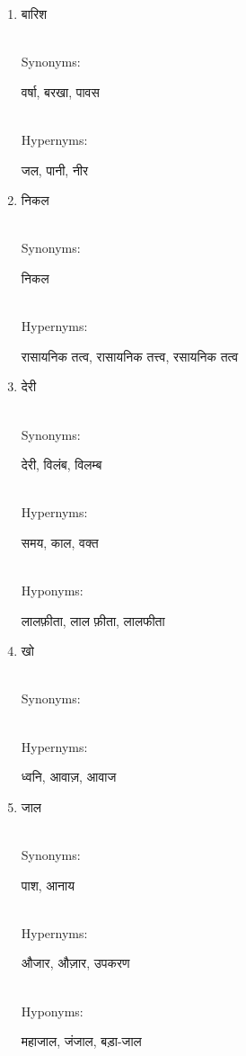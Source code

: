 \documentclass{article}
\begin{document}
\begin{enumerate}
\item \begin{hindi}बारिश\end{hindi} \\
Synonyms: \begin{hindi}वर्षा, बरखा, पावस\end{hindi} \\
Hypernyms: \begin{hindi}जल, पानी, नीर\end{hindi}

\item \begin{hindi}निकल\end{hindi} \\
Synonyms: \begin{hindi}निकल\end{hindi} \\
Hypernyms: \begin{hindi}रासायनिक तत्व, रासायनिक तत्त्व, रसायनिक तत्व\end{hindi}

\item \begin{hindi}देरी\end{hindi} \\
Synonyms: \begin{hindi}देरी, विलंब, विलम्ब\end{hindi} \\
Hypernyms: \begin{hindi}समय, काल, वक्त\end{hindi} \\
Hyponyms: \begin{hindi}लालफ़ीता, लाल फ़ीता, लालफीता\end{hindi}

\item \begin{hindi}खो\end{hindi} \\
Synonyms: \begin{hindi}\end{hindi} \\
Hypernyms: \begin{hindi}ध्वनि, आवाज़, आवाज\end{hindi}

\item \begin{hindi}जाल\end{hindi} \\
Synonyms: \begin{hindi}पाश, आनाय\end{hindi} \\
Hypernyms: \begin{hindi}औजार, औज़ार, उपकरण\end{hindi} \\
Hyponyms: \begin{hindi}महाजाल, जंजाल, बड़ा-जाल\end{hindi}


\end{enumerate}
\end{document}
